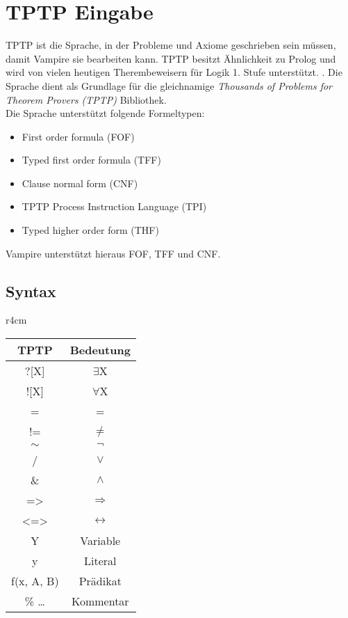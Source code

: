 \documentclass{article}
\begin{document}
\section{TPTP Eingabe}
\label{sec:input}

TPTP ist die Sprache, in der Probleme und Axiome geschrieben sein müssen, damit Vampire sie bearbeiten kann. TPTP besitzt Ähnlichkeit zu Prolog und wird von vielen heutigen Therembeweisern für Logik 1. Stufe unterstützt. \cite[S. 4]{cav2013}. Die Sprache dient als Grundlage für die gleichnamige \textit{Thousands of Problems for Theorem Provers (TPTP)} Bibliothek.\\
Die Sprache unterstützt folgende Formeltypen:
\begin{itemize}
	\item First order formula (FOF)
	\item Typed first order formula (TFF)
	\item Clause normal form (CNF)
	\item TPTP Process Instruction Language  (TPI)
	\item Typed higher order form (THF)
\end{itemize}
Vampire unterstützt hieraus FOF, TFF und CNF.

\subsection{Syntax}
\label{subsec:syntax}


\begin{wraptable}{r}{4cm}
\begin{tabular}{|c|c|}
	\hline TPTP & Bedeutung \\ 
	\hline ?[X] & $\exists$X \\
	\hline ![X] & $\forall$X \\
	\hline = & = \\
	\hline != & $\neq$ \\
	\hline $\sim$ & $\lnot$ \\
	\hline / & $\lor$ \\
	\hline \& & $\land$ \\
	\hline => & $\Rightarrow$ \\
	\hline <=> & $\leftrightarrow$ \\
	\hline Y & Variable \\
	\hline y & Literal \\
	\hline f(x, A, B) & Prädikat \\
	\hline \% \dots & Kommentar \\
	\hline
\end{tabular} 
\end{wraptable}
\end{document}

